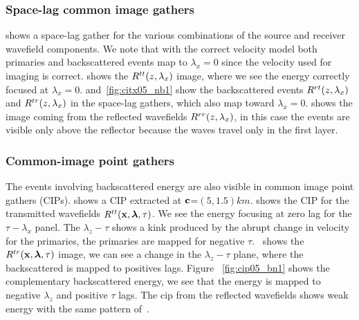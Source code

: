 \subsubsection{Space-lag common image gathers}


 shows a space-lag gather for the various combinations of the source and receiver wavefield components. 
We note that with the correct velocity model both primaries and backscattered events map to $\lambda_x=0$ since the velocity used for 
imaging is correct. 
%
 shows the $R^{tt}(z,\lambda_x)$ image, where we see the energy correctly focused at $\lambda_x=0$. 
 and~\ref{fig:citx05_nb1} show the backscattered events $R^{rt}(z,\lambda_x)$ and $R^{tr}(z,\lambda_x)$ in the space-lag gathers, 
which also map toward $\lambda_x=0$.
%
 shows the image coming from the reflected wavefields $R^{rr}(z,\lambda_x)$, in this case the events are
visible only above the reflector because the waves travel only in the first layer.

\subsubsection{Common-image point gathers}

The events involving backscattered energy are also visible in common image point gathers (CIPs).
%
 shows a CIP extracted at ${\bf c}$=$(5,1.5)km$.
 shows the CIP for the transmitted wavefields $R^{tt}({\bf x},{\boldsymbol{\lambda}},\tau)$. We see the energy focusing at zero lag 
for the $\tau-\lambda_x$ panel. The $\lambda_z-\tau$ shows a kink produced by the abrupt change in velocity for the primaries, the primaries
are mapped for negative $\tau$.~
 shows the $R^{tr}({\bf x},{\boldsymbol{\lambda}},\tau)$ image, we can see a change in the $\lambda_z-\tau$ plane, where the backscattered is mapped to positives lags. Figure
~\ref{fig:cip05_bn1} shows the complementary backscattered energy, we see that the energy is mapped to negative $\lambda_z$ and positive $\tau$ lags.
The cip from the reflected wavefields shows weak energy with the same pattern of~.




